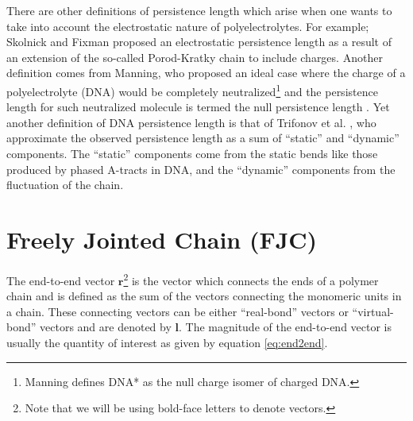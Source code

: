 
There are other definitions of persistence length which arise when one
wants   to   take   into   account   the   electrostatic   nature   of
polyelectrolytes. For example; Skolnick and Fixman \cite{skolnick1977}
proposed  an  electrostatic  persistence  length  as a  result  of  an
extension  of the  so-called  Porod-Kratky chain  to include  charges.
Another  definition comes  from Manning,  who proposed  an  ideal case
where  the  charge of  a  polyelectrolyte  (DNA)  would be  completely
neutralized\footnote{Manning defines DNA* as the null charge isomer of
  charged  DNA.}   and the  persistence  length  for such  neutralized
molecule  is termed  the null  persistence  length \cite{manning2006}.
Yet another definition  of DNA persistence length is  that of Trifonov
et al.  \cite{trifonov1987}, who approximate  the observed persistence
length  as  a  sum  of  ``static''  and  ``dynamic''  components.  The
``static'' components  come from the static bends  like those produced
by phased  A-tracts in  DNA, and the  ``dynamic'' components  from the
fluctuation of the chain.

\section{Freely Jointed Chain (FJC)}
\label{sec:fjc}
The end-to-end vector $\mathbf{r}$\footnote{Note that we will be using
  bold-face letters to denote  vectors.}  is the vector which connects
the ends of a  polymer chain and is defined as the  sum of the vectors
connecting the  monomeric units in a chain.   These connecting vectors
can be  either ``real-bond''  vectors or ``virtual-bond''  vectors and
are denoted  by $\mathbf{l}$.  The magnitude of  the end-to-end vector
is   usually  the   quantity  of   interest  as   given   by  equation
\ref{eq:end2end}.

